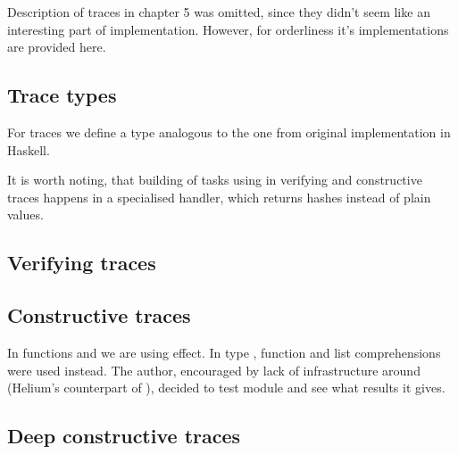 Description of traces in chapter 5 was omitted, since they didn't seem like an interesting part of implementation. However, for orderliness it's implementations are provided here.

\subsection{Trace types}

For traces we define a type analogous to the one from original implementation in Haskell.

\begin{minipage}{\textwidth}
  
\end{minipage}

It is worth noting, that building of tasks using  in verifying and constructive traces happens in a specialised handler, which returns hashes instead of plain values.

\subsection{Verifying traces}

\begin{minipage}{\textwidth}
  
\end{minipage}

\subsection{Constructive traces}

\begin{minipage}{\textwidth}
  
\end{minipage}

In functions  and  we are using  effect. In \BSaLC{} type , function  and list comprehensions were used instead. The author, encouraged by lack of infrastructure around  (Helium's counterpart of ), decided to test  module and see what results it gives.

\subsection{Deep constructive traces}

\begin{minipage}{\textwidth}
  
\end{minipage}
